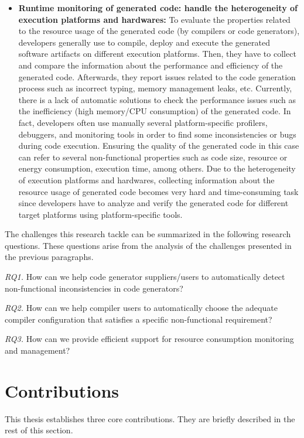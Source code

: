 \begin{itemize}
\item
\textbf{Runtime monitoring of generated code: handle the heterogeneity of execution platforms and hardwares:} To evaluate the properties related to the resource usage of the generated code (by compilers or code generators), developers generally use to compile, deploy and execute the generated software artifacts on different execution platforms. Then, they have to collect and compare the information about the performance and efficiency of the generated code. Afterwards, they report issues related to the code generation process such as incorrect typing, memory management leaks, etc.
Currently, there is a lack of automatic solutions to check the performance issues such as the inefficiency (high memory/CPU consumption) of the generated code. In fact, developers often use manually several platform-specific profilers, debuggers, and monitoring tools\cite{guana2014chaintracker,delgado2004taxonomy} in order to find some inconsistencies or bugs during code execution. Ensuring the quality of the generated code in this case can refer to several non-functional properties such as code size, resource or energy consumption, execution time, among others\cite{pan2006fast}. Due to the heterogeneity of execution platforms and hardwares, collecting information about the resource usage of generated code becomes very hard and time-consuming task since developers have to analyze and verify the generated code for different target platforms using platform-specific tools. 


\end{itemize}
The challenges this research tackle can be summarized in the following research questions. These questions arise from the analysis of the challenges presented in the previous paragraphs.

\textit{RQ1.} How can we help code generator suppliers/users to automatically detect non-functional inconsistencies in code generators?

\textit{RQ2.} How can we help compiler users to automatically choose the adequate compiler configuration that satisfies a specific non-functional requirement?

\textit{RQ3.} How can we provide efficient support for resource consumption monitoring and management?


\section{Contributions}
This thesis establishes three core contributions. They are briefly described in the rest of this section.

